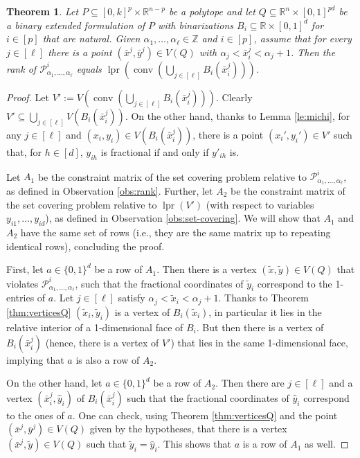 \documentclass[11pt,a4paper]{article}
\newtheorem{theorem}{Theorem}[section]
\newcommand{\R}{\mathbb{R}}
\newcommand{\conv}{\operatorname{conv}}
\newcommand{\Z}{\mathbb{Z}}
\newcommand{\1}{\textbf{1}}
\newcommand{\lpr}{\operatorname{lpr}}
\begin{document}
\begin{theorem}\label{thm:onebin} Let $P\subseteq [0,k]^p\times \R^{n-p}$ be a polytope and let $Q\subseteq\R^n\times [0,1]^{pd}$ be a binary extended formulation of $P$ with binarizations $B_i\subseteq \R\times [0,1]^d$ for $i\in [p]$ that are natural. Given $\alpha_1,\dots,\alpha_{\ell}\in \Z$ and $i\in[p]$,  assume that for every $j\in [\ell]$ there is a point $(\bar{x}^j,
\bar{y}^j)\in V(Q)$ with $\alpha_j<\bar{x}^j_i<\alpha_j+1$. 
Then the rank of $\mathcal{P}^i_{\alpha_1,\dots,\alpha_{\ell}}$ equals  $\lpr(\conv(\bigcup_{j\in [\ell]} B_i(\bar{x}^j_i)))$.
\end{theorem}

\begin{proof}
Let $V':=V(\conv(\bigcup_{j\in [\ell]} B_i(\bar{x}^j_i)))$. Clearly $V'\subseteq \bigcup_{j\in [\ell]} V(B_i(\bar{x}^j_i))$. On the other hand, thanks to Lemma \ref{le:michi}, for any $j\in [\ell]$ and $(x_i,y_i)\in V(B_i(\bar{x}^j_i))$, there is a point $(x_i',y_i')\in V'$ such that, for $h\in[d]$, $y_{ih}$ is fractional if and only if $y'_{ih}$ is.

Let $A_1$ be the constraint matrix of the set covering problem relative to $\mathcal{P}^i_{\alpha_1,\dots,\alpha_{\ell}}$, as defined in Observation \ref{obs:rank}. Further, let $A_2$ be the constraint matrix of the set covering problem relative to $\lpr(V')$ (with respect to variables $y_{i1},\dots,y_{id}$), as defined in Observation \ref{obs:set-covering}. We will show that $A_1$ and $A_2$ have the same set of rows (i.e., they are the same matrix up to repeating identical rows), concluding the proof.

First, let $a\in \{0,1\}^d$ be a row of $A_1$. Then there is a vertex $(\tilde{x},\tilde{y})\in V(Q)$ that violates $\mathcal{P}^i_{\alpha_1,\dots,\alpha_{\ell}}$, such that the fractional coordinates of $\tilde{y}_i$ correspond to the 1-entries of $a$. Let $j\in [\ell]$ satisfy $\alpha_j<\tilde{x}_i<\alpha_j+1$. Thanks to Theorem \ref{thm:verticesQ} $(\tilde{x}_i,\tilde{y}_i)$ is a vertex of $B_i(\tilde{x}_i)$, in particular it lies in the relative interior of a 1-dimensional face of $B_i$. But then there is a vertex of $B_i(\bar{x}_i^j)$ (hence, there is a vertex of $V'$) that lies in the same 1-dimensional face, implying that  $a$ is also a row of $A_2$.

On the other hand, let $a\in \{0,1\}^d$ be a row of $A_2$. Then there are $j\in[\ell]$ and a vertex $(\bar{x}^j_i,\hat{y}_i)$ of $B_i(\bar{x}_i^j)$ such that the fractional coordinates of $\hat{y}_i$ correspond to the ones of $a$.
One can check, using Theorem \ref{thm:verticesQ} and the point $(\bar{x}^j,
\bar{y}^j)\in V(Q)$ given by the hypotheses, that there is a vertex $(\bar{x}^j, \tilde{y})\in V(Q)$ such that $\tilde{y}_i=\hat{y}_i$. This shows that $a$ is a row of $A_1$ as well.
\end{proof}
\end{document}
